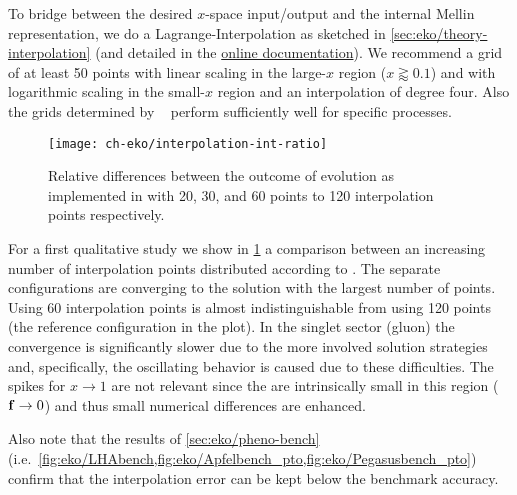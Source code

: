 To bridge between the desired $x$-space input/output and the internal
Mellin representation, we do a Lagrange-Interpolation as sketched in
\cref{sec:eko/theory-interpolation}
(and detailed in the \href{https://eko.readthedocs.io/en/latest/}{online documentation}).
We recommend a grid of at least 50 points with
linear scaling in the large-$x$ region ($x \gtrapprox 0.1$) and with logarithmic
scaling in the small-$x$ region and an interpolation of degree four.
Also the grids determined by \amcfast~\cite{Bertone:2014zva} perform
sufficiently well for specific processes.

\begin{figure}
    \begin{center}
    \texttt{[image: ch-eko/interpolation-int-ratio]}
    \end{center}
    \caption{Relative differences between 
        the outcome of \nnlo{} \qcd{} evolution
        as implemented in \eko{} with 20, 30, and 60 points to 120
        interpolation points respectively.
        \label{fig:eko/interpolation} }
\end{figure}

For a first qualitative study we show in \cref{fig:eko/interpolation} a
comparison between an increasing number of interpolation points
distributed according to \cite[Eq. 2.12]{Carrazza_2020}.
The separate configurations are converging to the solution with the
largest number of points. Using 60 interpolation points is almost
indistinguishable from using 120 points (the reference configuration in the plot).
In the singlet sector (gluon) the convergence is
significantly slower due to the more involved solution strategies and,
specifically, the oscillating behavior is caused due to these difficulties.
The spikes for $x\to 1$ are not relevant since the \pdfs are intrinsically
small in this region ($\vb f\to 0$) and thus small numerical differences
are enhanced.

Also note that the results of \cref{sec:eko/pheno-bench} (i.e.\
\cref{fig:eko/LHAbench,fig:eko/Apfelbench_pto,fig:eko/Pegasusbench_pto})
confirm that the interpolation error can be kept below the benchmark accuracy.

